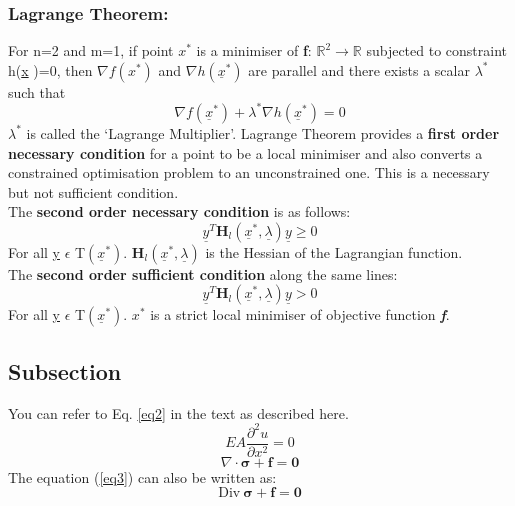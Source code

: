\documentclass[12pt,a4paper,titlepage]{article}
\begin{document}
\subsubsection{Lagrange Theorem:}
For n=2 and m=1, if point $x^{*}$ is a minimiser of \textbf{f}: $\mathbb{R}^{2}\rightarrow\mathbb{R}$ subjected to constraint h(\underline{x} )=0, then $\nabla f (x^{*})$ and $\nabla h(\underline{x}^{*})$  are parallel and there exists a scalar $\lambda ^{*}$ such that
\begin{equation}
    \nabla f(\underline{x}^{*})+ \lambda^{*} \nabla h(\underline{x}^{*}) = 0
\end{equation}
$\lambda^{*}$ is called the `Lagrange Multiplier'. Lagrange Theorem provides a \textbf{first order necessary condition} for a point to be a local minimiser and also converts a constrained optimisation problem to an unconstrained one. This is a necessary but not sufficient condition.\\
The \textbf{second order necessary condition} is as follows:
\begin{equation}
    \underline{y}^{T}\textbf{H}_{l}(\underline{x}^{*}, \underline{\lambda})\underline{y} \geq 0 
\end{equation}
For all \underline{y} $\epsilon$ T$(\underline{x}^{*})$. $\textbf{H}_{l}(\underline{x}^{*}, \underline{\lambda})$ is the Hessian of the Lagrangian function.\\
The \textbf{second order sufficient condition} along the same lines:
\begin{equation}
    \underline{y}^{T}\textbf{H}_{l}(\underline{x}^{*}, \underline{\lambda})\underline{y} > 0 
\end{equation}
For all \underline{y} $\epsilon$ T$(\underline{x}^{*})$. $x^{*}$
is a strict local minimiser of objective function \textbf{\textit{f}}.

\subsection{Subsection}
You can refer to Eq. \ref{eq2} in the text as described here.
%
\begin{equation}
    EA \dfrac{\partial^{2} u}{\partial x^{2}} = 0 \label{eq2}
\end{equation}
%
%
\begin{equation}
    \nabla \cdot \boldsymbol{\sigma} + \boldsymbol{f} = \mathbf{0} \label{eq3}
\end{equation}
%
The equation (\ref{eq3}) can also be written as:
%
\begin{equation}
    \mathrm{Div} \ \boldsymbol{\sigma} + \boldsymbol{f} = \mathbf{0} \label{eq4}
\end{equation}
%
%
\clearpage


\end{document}
